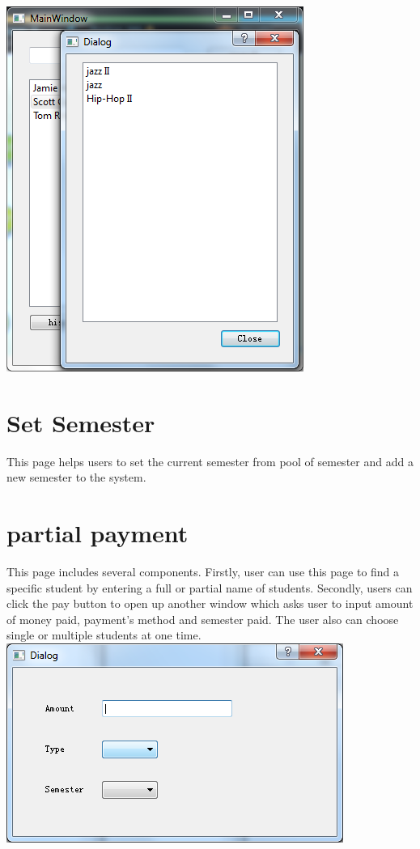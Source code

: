 \documentclass[11pt]{book}
\begin{document}
\includegraphics[scale=0.5]{teacherHistory.png}

\section{Set Semester}
This page helps users to set the current semester from pool of semester and add a new semester to the system.

\section{partial payment}
This page includes several components. Firstly, user can use this page to find a specific student by entering a full or partial name of students. Secondly, users can click the pay button to open up another window which asks user to input amount of money paid, payment's method and semester paid. The user also can choose single or multiple students at one time. \\
\includegraphics[scale=0.5]{payment.png}
\end{document}
